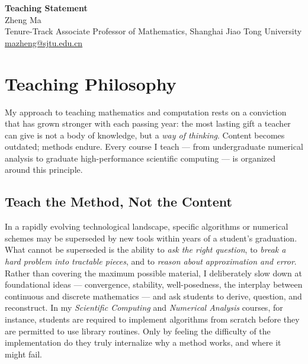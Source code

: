 \documentclass[12pt, a4paper]{article}
\begin{document}
\begin{center}
  {\LARGE\bfseries Teaching Statement}\\[0.8em]
  {\large Zheng Ma}\\[0.3em]
  {\normalsize
  Tenure-Track Associate Professor of Mathematics, Shanghai Jiao Tong University}\\[0.25em]
  {\normalsize \href{mailto:mazheng@sjtu.edu.cn}{mazheng@sjtu.edu.cn}}
\end{center}

\bigskip

\section{Teaching Philosophy}

My approach to teaching mathematics and computation rests on a conviction that
has grown stronger with each passing year: the most lasting gift a teacher can
give is not a body of knowledge, but a \emph{way of thinking}.
Content becomes outdated; methods endure.
Every course I teach --- from undergraduate numerical analysis to graduate
high-performance scientific computing --- is organized around this principle.

\subsection{Teach the Method, Not the Content}

In a rapidly evolving technological landscape, specific algorithms or
numerical schemes may be superseded by new tools within years of a student's
graduation.
What cannot be superseded is the ability to \emph{ask the right question},
to \emph{break a hard problem into tractable pieces}, and to
\emph{reason about approximation and error}.
Rather than covering the maximum possible material, I deliberately slow down
at foundational ideas --- convergence, stability, well-posedness, the interplay
between continuous and discrete mathematics --- and ask students to derive,
question, and reconstruct.
In my \emph{Scientific Computing} and \emph{Numerical Analysis} courses,
for instance, students are required to implement algorithms from scratch
before they are permitted to use library routines.
Only by feeling the difficulty of the implementation do they truly internalize why
a method works, and where it might fail.
\end{document}
